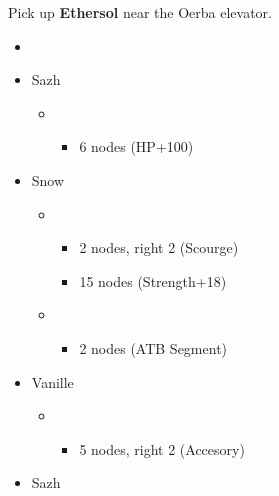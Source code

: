 Pick up \textbf{Ethersol} near the Oerba elevator.

\begin{menu}
	\begin{itemize}
		\paradigm
		\begin{itemize}
			\item {}%
				  {\paradigmline{\syn}{(\rav)}{(\sab)}}%
			      {\paradigmline{\com}{\rav}{\rav}}%
			      {\paradigmline[4]{\rav}{\sen}{(\med)}}%
			      {\paradigmline{\com}{(\sen)}{(\med)}}%
			      {\paradigmline{\rav}{(\rav)}{\sab}}%
			      {\paradigmline{\com}{(\rav)}{(\med)}}%
		\end{itemize}
		\crystarium
		\begin{itemize}
			\item Sazh
				\begin{itemize}
					\item \rav
						\begin{itemize}
							\item 6 nodes (HP+100)
						\end{itemize}
				\end{itemize}
			\item Snow
				\begin{itemize}
					\item \com
						\begin{itemize}
							\item 2 nodes, right 2 (Scourge)
							\item 15 nodes (Strength+18)
						\end{itemize}
					\item \sen
						\begin{itemize}
							\item 2 nodes (ATB Segment)
						\end{itemize}
				\end{itemize}
			\item Vanille
				\begin{itemize}
					\item \med
						\begin{itemize}
							\item 5 nodes, right 2 (Accesory)
						\end{itemize}
				\end{itemize}							      	
		\end{itemize}
		\equip
		\begin{itemize}
			\item Sazh

\end{itemize}
\end{itemize}
\end{menu}
